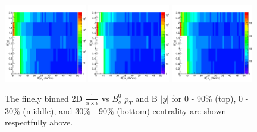 \begin{figure}[h]
\begin{center}
\includegraphics[width= 0.32\textwidth]{Figures/Chapter4/BsEff2D_0_90.png}
\includegraphics[width= 0.32\textwidth]{Figures/Chapter4/BsEff2D_0_30.png}
\includegraphics[width= 0.32\textwidth]{Figures/Chapter4/BsEff2D_30_90.png}
\caption{The finely binned 2D $\frac{1}{\alpha \times \epsilon}$ vs $B^0_s$ $p_T$ and B $|y|$ for 0 - 90\% (top), 0 - 30\% (middle), and 30\% - 90\% (bottom) centrality are shown respectfully above.}
\label{Bs2DMap}
\end{center}
\end{figure}

